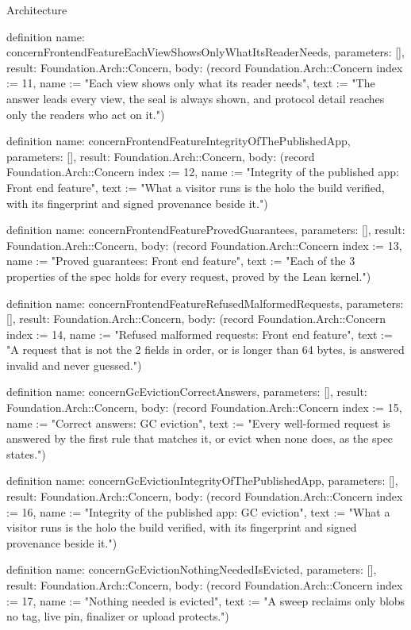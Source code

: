 \begin{lexlean}{Architecture}
\begin{semanticmodule}
definition{
  name: concernFrontendFeatureEachViewShowsOnlyWhatItsReaderNeeds,
  parameters: [],
  result: Foundation.Arch::Concern,
  body: (record Foundation.Arch::Concern {index := 11, name := "Each view shows only what its reader needs", text := "The answer leads every view, the seal is always shown, and protocol detail reaches only the readers who act on it."})
}

definition{
  name: concernFrontendFeatureIntegrityOfThePublishedApp,
  parameters: [],
  result: Foundation.Arch::Concern,
  body: (record Foundation.Arch::Concern {index := 12, name := "Integrity of the published app: Front end feature", text := "What a visitor runs is the holo the build verified, with its fingerprint and signed provenance beside it."})
}

definition{
  name: concernFrontendFeatureProvedGuarantees,
  parameters: [],
  result: Foundation.Arch::Concern,
  body: (record Foundation.Arch::Concern {index := 13, name := "Proved guarantees: Front end feature", text := "Each of the 3 properties of the spec holds for every request, proved by the Lean kernel."})
}

definition{
  name: concernFrontendFeatureRefusedMalformedRequests,
  parameters: [],
  result: Foundation.Arch::Concern,
  body: (record Foundation.Arch::Concern {index := 14, name := "Refused malformed requests: Front end feature", text := "A request that is not the 2 fields in order, or is longer than 64 bytes, is answered invalid and never guessed."})
}

definition{
  name: concernGcEvictionCorrectAnswers,
  parameters: [],
  result: Foundation.Arch::Concern,
  body: (record Foundation.Arch::Concern {index := 15, name := "Correct answers: GC eviction", text := "Every well-formed request is answered by the first rule that matches it, or evict when none does, as the spec states."})
}

definition{
  name: concernGcEvictionIntegrityOfThePublishedApp,
  parameters: [],
  result: Foundation.Arch::Concern,
  body: (record Foundation.Arch::Concern {index := 16, name := "Integrity of the published app: GC eviction", text := "What a visitor runs is the holo the build verified, with its fingerprint and signed provenance beside it."})
}

definition{
  name: concernGcEvictionNothingNeededIsEvicted,
  parameters: [],
  result: Foundation.Arch::Concern,
  body: (record Foundation.Arch::Concern {index := 17, name := "Nothing needed is evicted", text := "A sweep reclaims only blobs no tag, live pin, finalizer or upload protects."})
}


\end{semanticmodule}
\end{lexlean}
